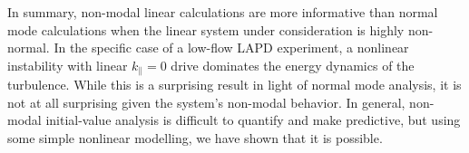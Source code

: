 \documentclass[showpacs,preprintnumbers,amsmath,amssymb,superscriptaddress,aip]{revtex4-1}
\def\para{\parallel}
\begin{document}
In summary, non-modal linear calculations are more informative than normal mode calculations when the linear system under consideration is highly non-normal. In the specific case of a low-flow
LAPD experiment, a nonlinear instability with linear $k_\para=0$ drive dominates the energy dynamics of the turbulence. While this is a surprising result in light of normal mode analysis,
it is not at all surprising given the system's non-modal behavior. In general, non-modal initial-value analysis is difficult to quantify and make predictive, but using some simple nonlinear modelling,
we have shown that it is possible.

\begin{acknowledgments}

\end{acknowledgments}





%
\end{document}
